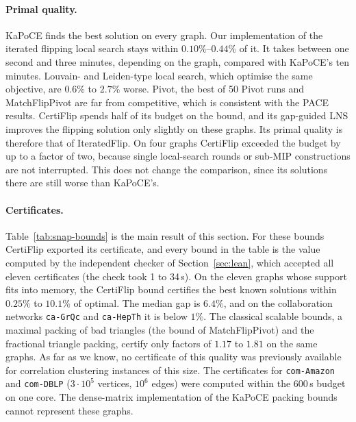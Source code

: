 \paragraph{Primal quality.}  KaPoCE finds the best solution on every graph.
Our implementation of the iterated flipping local search stays within
$0.10\%$--$0.44\%$ of it.  It takes between one second and three minutes,
depending on the graph, compared with KaPoCE's ten minutes.  Louvain- and
Leiden-type local search, which optimise the same objective, are $0.6\%$ to
$2.7\%$ worse.  Pivot, the best of 50 Pivot runs and MatchFlipPivot are far
from competitive, which is consistent with the PACE results.  CertiFlip
spends half of its budget on the bound, and its gap-guided LNS improves the
flipping solution only slightly on these graphs.  Its primal quality is
therefore that of IteratedFlip.  On four graphs CertiFlip exceeded the budget
by up to a factor of two, because single local-search rounds or sub-MIP
constructions are not interrupted.  This does not change the comparison,
since its solutions there are still worse than KaPoCE's.

\paragraph{Certificates.}  Table~\ref{tab:snap-bounds} is the main result of
this section.  For these bounds CertiFlip exported its certificate, and every
bound in the table is the value computed by the independent checker of
Section~\ref{sec:lean}, which accepted all eleven certificates (the check took
1 to 34\,s).  On the eleven graphs whose support fits into memory, the
CertiFlip bound certifies the best known solutions within $0.25\%$ to $10.1\%$
of optimal.  The median gap is $6.4\%$, and on the collaboration networks
\texttt{ca-GrQc} and \texttt{ca-HepTh} it is below $1\%$.  The classical
scalable bounds, a maximal packing of bad triangles (the bound of
MatchFlipPivot) and the fractional triangle packing, certify only factors of
$1.17$ to $1.81$ on the same graphs.  As far as we know, no certificate of this
quality was previously available for correlation clustering instances of
this size.  The certificates for \texttt{com-Amazon} and \texttt{com-DBLP}
($3\cdot10^5$ vertices, $10^6$ edges) were computed within the 600\,s budget
on one core.  The dense-matrix implementation of the KaPoCE packing bounds cannot
represent these graphs.

